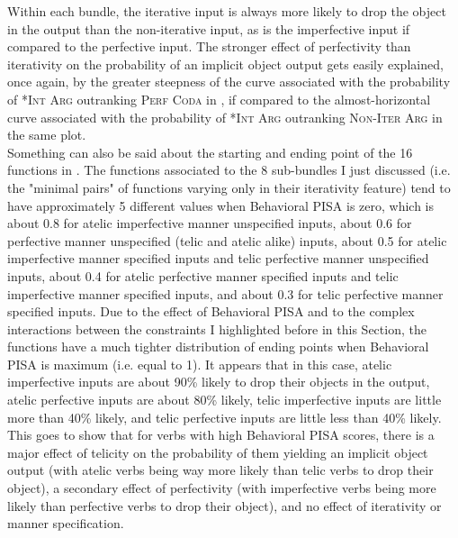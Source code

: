 Within each bundle, the iterative input is always more likely to drop the object in the output than the non-iterative input, as is the imperfective input if compared to the perfective input. The stronger effect of perfectivity than iterativity on the probability of an implicit object output gets easily explained, once again, by the greater steepness of the curve associated with the probability of \textsc{*Int Arg} outranking \textsc{Perf Coda} in , if compared to the almost-horizontal curve associated with the probability of \textsc{*Int Arg} outranking \textsc{Non-Iter Arg} in the same plot.\\
Something can also be said about the starting and ending point of the 16 functions in . The functions associated to the 8 sub-bundles I just discussed (i.e. the "minimal pairs" of functions varying only in their iterativity feature) tend to have approximately 5 different values when Behavioral PISA is zero, which is about 0.8 for atelic imperfective manner unspecified inputs, about 0.6 for perfective manner unspecified (telic and atelic alike) inputs, about 0.5 for atelic imperfective manner specified inputs and telic perfective manner unspecified inputs, about 0.4 for atelic perfective manner specified inputs and telic imperfective manner specified inputs, and about 0.3 for telic perfective manner specified inputs. Due to the effect of Behavioral PISA and to the complex interactions between the constraints I highlighted before in this Section, the functions have a much tighter distribution of ending points when Behavioral PISA is maximum (i.e. equal to 1). It appears that in this case, atelic imperfective inputs are about 90\% likely to drop their objects in the output, atelic perfective inputs are about 80\% likely, telic imperfective inputs are little more than 40\% likely, and telic perfective inputs are little less than 40\% likely. This goes to show that for verbs with high Behavioral PISA scores, there is a major effect of telicity on the probability of them yielding an implicit object output (with atelic verbs being way more likely than telic verbs to drop their object), a secondary effect of perfectivity (with imperfective verbs being more likely than perfective verbs to drop their object), and no effect of iterativity or manner specification.\\
